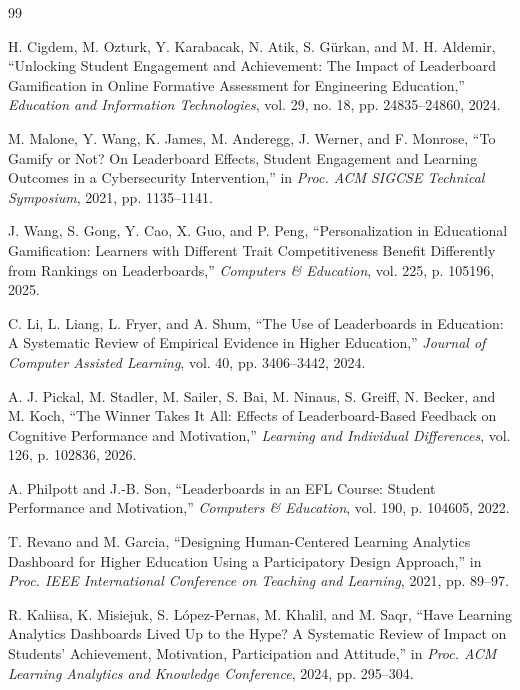 \documentclass[conference]{IEEEtran}
\begin{document}
\begin{thebibliography}{99}

H. Cigdem, M. Ozturk, Y. Karabacak, N. Atik, S. Gürkan, and M. H. Aldemir, ``Unlocking Student Engagement and Achievement: The Impact of Leaderboard Gamification in Online Formative Assessment for Engineering Education,'' \textit{Education and Information Technologies}, vol. 29, no. 18, pp. 24835--24860, 2024.

M. Malone, Y. Wang, K. James, M. Anderegg, J. Werner, and F. Monrose, ``To Gamify or Not? On Leaderboard Effects, Student Engagement and Learning Outcomes in a Cybersecurity Intervention,'' in \textit{Proc. ACM SIGCSE Technical Symposium}, 2021, pp. 1135--1141.

J. Wang, S. Gong, Y. Cao, X. Guo, and P. Peng, ``Personalization in Educational Gamification: Learners with Different Trait Competitiveness Benefit Differently from Rankings on Leaderboards,'' \textit{Computers \& Education}, vol. 225, p. 105196, 2025.

C. Li, L. Liang, L. Fryer, and A. Shum, ``The Use of Leaderboards in Education: A Systematic Review of Empirical Evidence in Higher Education,'' \textit{Journal of Computer Assisted Learning}, vol. 40, pp. 3406--3442, 2024.

A. J. Pickal, M. Stadler, M. Sailer, S. Bai, M. Ninaus, S. Greiff, N. Becker, and M. Koch, ``The Winner Takes It All: Effects of Leaderboard-Based Feedback on Cognitive Performance and Motivation,'' \textit{Learning and Individual Differences}, vol. 126, p. 102836, 2026.

A. Philpott and J.-B. Son, ``Leaderboards in an EFL Course: Student Performance and Motivation,'' \textit{Computers \& Education}, vol. 190, p. 104605, 2022.

T. Revano and M. Garcia, ``Designing Human-Centered Learning Analytics Dashboard for Higher Education Using a Participatory Design Approach,'' in \textit{Proc. IEEE International Conference on Teaching and Learning}, 2021, pp. 89--97.

R. Kaliisa, K. Misiejuk, S. López-Pernas, M. Khalil, and M. Saqr, ``Have Learning Analytics Dashboards Lived Up to the Hype? A Systematic Review of Impact on Students' Achievement, Motivation, Participation and Attitude,'' in \textit{Proc. ACM Learning Analytics and Knowledge Conference}, 2024, pp. 295--304.


\end{thebibliography}
\end{document}

